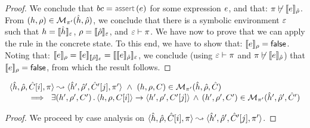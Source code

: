 \begin{proof}
\noindent{}
We conclude that  $\bcmd = \assert(\jsilexpr)$ for some expression $\jsilexpr$, and that: 
$\pc \not\vdash  \symbeval{\jsilexpr}{\sstore}$. 
From $(\heap, \store) \in \smodels{\sheap, \sstore}{\pc'}$, we conclude that there is a symbolic environment
$\senv$ such that $\heap = \semexpr{\sheap}{\senv}$, $\store = \semexpr{\sstore}{\senv}$, and 
$\senv \vdash \pc$. 
We have now to prove that we can apply the  rule in the concrete state.
To this end, we have to show that: $\symbeval{\jsilexpr}{\store} = \jfalse$. 
Noting that:
$
  \symbeval{\jsilexpr}{\store} = \symbeval{\jsilexpr}{\symbeval{\sstore}{\senv}} 
         = \symbeval{\symbeval{\jsilexpr}{\sstore}}{\senv} 
$, we conclude (using $\senv \vdash \pc$ and $\pc \not\vdash  \symbeval{\jsilexpr}{\sstore}$) that 
$\symbeval{\jsilexpr}{\store} = \jfalse$, from which the result follows. 
\end{proof}


\begin{temax}
$$
\begin{array}{l}
\symbtrans{\sheap, \sstore, \sctx[i], \pc}{\sheap', \sstore', \sctx'[j], \pc'} 
   \ \wedge \ 
      (\heap, \store, \ctx) \in \smodels{\sheap, \sstore, \sctx}{\pc'} \\ \quad \quad
      	 \ \implies \ \exists (\heap', \store', \ctx') \, . \, 
	 	 \semtrans{\heap, \store, \ctx[i]}{\heap', \store', \ctx'[j]}
		\, \wedge \, 
		(\heap', \store', \ctx') \in \smodels{\sheap', \sstore', \sctx'}{\pc'}  
\end{array}
$$
\end{temax}
%
\begin{proof}
We proceed by case analysis on $\symbtrans{\sheap, \sstore, \sctx[i], \pc}{\sheap', \sstore', \sctx'[j], \pc'}$. 

\end{proof}
